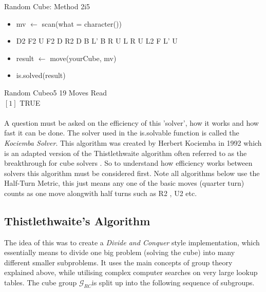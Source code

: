 \documentclass{article}
\newcounter{theo}[section]\setcounter{theo}{0}
\newcounter{lem}[section]\setcounter{lem}{0}
\begin{document}
\begin{myinput}{Random Cube: Method 2}{i5}
\begin{itemize}
\item mv $\leftarrow$ scan(what = character())
\item D2 F2 U F2 D R2 D B L' B R U L R U L2 F L' U
\item result $\leftarrow$ move(yourCube, mv)
\item is.solved(result)
\end{itemize}
\end{myinput}

\begin{myoutput}{Random Cube}{o5}
19 Moves Read \\
$[1]$ TRUE
\end{myoutput}

\paragraph*{}

A question must be asked on the efficiency of this 'solver', how it works and how fast it can be done. 
The solver used in the is.solvable function is called the \textit{Kociemba Solver}. This algorithm was created by Herbert Kociemba in 1992 which is an adapted version of the Thistlethwaite algorithm often referred to as the breakthrough for cube solvers\cite{Thistlethwaite}
. So to understand how efficiency works between solvers this algorithm must be considered first. Note all algorithms below use the Half-Turn Metric, this just means any one of the basic moves (quarter turn) counts as one move alongwith  half turns such as R2 , U2 etc. 

\subsection{Thistlethwaite's Algorithm}

The idea of this was to create a \textit{Divide and Conquer} style implementation, which essentially means to divide one big problem (solving the cube) into many different smaller subproblems. It uses the main concepts of group theory explained above, while utilising complex computer searches on very large lookup tables. 
The cube group $\mathcal{G}_{RC}$is split up into the following sequence of subgroups.  
\end{document}

